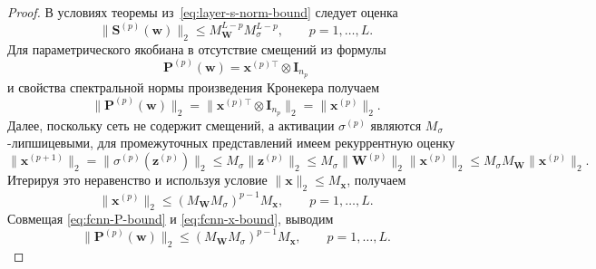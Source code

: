 \begin{proof}
    В условиях теоремы из~\eqref{eq:layer-s-norm-bound} следует оценка
    \begin{equation}
        \label{eq:fcnn-S-bound}
        \|\mathbf{S}^{(p)}(\mathbf{w})\|_2
        \leqslant
        M_{\mathbf{W}}^{L-p} M_{\sigma}^{L-p},
        \qquad p = 1, \ldots, L.
    \end{equation}
    Для параметрического якобиана в отсутствие смещений из формулы
    \begin{equation}
        \mathbf{P}^{(p)}(\mathbf{w})
        =
        \mathbf{x}^{(p)\top} \otimes \mathbf{I}_{n_p}
    \end{equation}
    и свойства спектральной нормы произведения Кронекера получаем
    \begin{equation}
        \label{eq:fcnn-P-bound}
        \|\mathbf{P}^{(p)}(\mathbf{w})\|_2
        =
        \|\mathbf{x}^{(p)\top} \otimes \mathbf{I}_{n_p}\|_2
        =
        \|\mathbf{x}^{(p)}\|_2.
    \end{equation}
    Далее, поскольку сеть не содержит смещений, а активации $\sigma^{(p)}$ являются $M_{\sigma}$-липшицевыми, для промежуточных представлений имеем рекуррентную оценку
    \begin{equation}
        \|\mathbf{x}^{(p+1)}\|_2
        =
        \|\sigma^{(p)}(\mathbf{z}^{(p)})\|_2
        \leqslant
        M_{\sigma}\|\mathbf{z}^{(p)}\|_2
        \leqslant
        M_{\sigma}\|\mathbf{W}^{(p)}\|_2\|\mathbf{x}^{(p)}\|_2
        \leqslant
        M_{\sigma}M_{\mathbf{W}}\|\mathbf{x}^{(p)}\|_2.
    \end{equation}
    Итерируя это неравенство и используя условие $\|\mathbf{x}\|_2 \leqslant M_{\mathbf{x}}$, получаем
    \begin{equation}
        \label{eq:fcnn-x-bound}
        \|\mathbf{x}^{(p)}\|_2
        \le
        (M_{\mathbf{W}}M_{\sigma})^{p-1} M_{\mathbf{x}},
        \qquad p = 1, \ldots, L.
    \end{equation}
    Совмещая \eqref{eq:fcnn-P-bound} и \eqref{eq:fcnn-x-bound}, выводим
    \begin{equation}
        \label{eq:fcnn-P-bound-final}
        \|\mathbf{P}^{(p)}(\mathbf{w})\|_2
        \le
        (M_{\mathbf{W}}M_{\sigma})^{p-1} M_{\mathbf{x}},
        \qquad p=1, \dots, L.
    \end{equation}


\end{proof}
